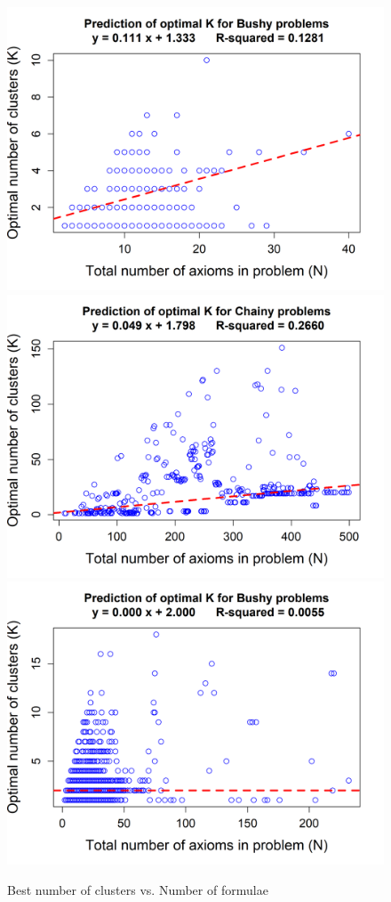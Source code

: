 \documentclass[EPiC]{easychair}
\begin{document}
\begin{figure}[h]
\includegraphics[scale=0.42]{median-regression-optimal-k-bushy-325.png}
\includegraphics[scale=0.42]{median-regression-optimal-k-chainy-325.png}\\
\includegraphics[scale=0.42]{median-regression-optimal-k-bushy-1551.png}
\caption{Best number of clusters vs. Number of formulae}
\label{fig:median-regression}
\end{figure}
\end{document}
